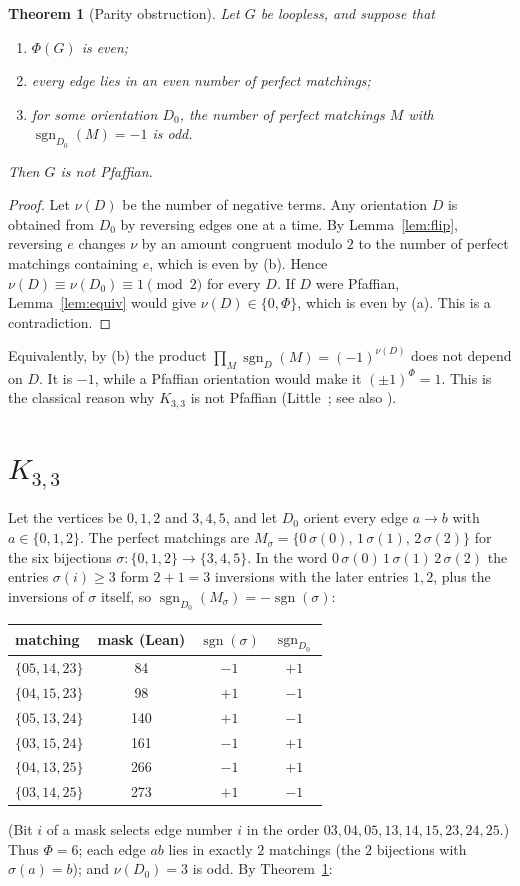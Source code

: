 \documentclass[11pt]{article}
\newtheorem{theorem}{Theorem}
\theoremstyle{definition}
\theoremstyle{remark}
\begin{document}
\begin{theorem}[Parity obstruction]\label{thm:obstruction}
Let $G$ be loopless, and suppose that
\begin{enumerate}
\item[(a)] $\Phi(G)$ is even;
\item[(b)] every edge lies in an even number of perfect matchings;
\item[(c)] for some orientation $D_0$, the number of perfect matchings $M$ with
$\operatorname{sgn}_{D_0}(M)=-1$ is odd.
\end{enumerate}
Then $G$ is not Pfaffian.
\end{theorem}
\begin{proof}
Let $\nu(D)$ be the number of negative terms. Any orientation $D$ is obtained from
$D_0$ by reversing edges one at a time. By Lemma~\ref{lem:flip}, reversing $e$
changes $\nu$ by an amount congruent modulo $2$ to the number of perfect matchings
containing $e$, which is even by (b). Hence $\nu(D)\equiv\nu(D_0)\equiv1\pmod2$ for
every $D$. If $D$ were Pfaffian, Lemma~\ref{lem:equiv} would give $\nu(D)\in\{0,\Phi\}$,
which is even by (a). This is a contradiction.
\end{proof}
Equivalently, by (b) the product $\prod_M\operatorname{sgn}_D(M)=(-1)^{\nu(D)}$ does not
depend on $D$. It is $-1$, while a Pfaffian orientation would make it
$(\pm1)^{\Phi}=1$. This is the classical reason why $K_{3,3}$ is not Pfaffian
(Little~\cite{little}; see also \cite{lp,rst}).

\section[K\_\{3,3\}]{\texorpdfstring{$K_{3,3}$}{K33}}
Let the vertices be $0,1,2$ and $3,4,5$, and let $D_0$ orient every edge $a\to b$ with
$a\in\{0,1,2\}$. The perfect matchings are $M_\sigma=\{0\,\sigma(0),\,1\,\sigma(1),\,2\,\sigma(2)\}$
for the six bijections $\sigma:\{0,1,2\}\to\{3,4,5\}$. In the word
$0\,\sigma(0)\,1\,\sigma(1)\,2\,\sigma(2)$ the entries $\sigma(i)\ge3$ form $2+1=3$
inversions with the later entries $1,2$, plus the inversions of $\sigma$ itself, so
$\operatorname{sgn}_{D_0}(M_\sigma)=-\operatorname{sgn}(\sigma)$:
\begin{center}
\begin{tabular}{lccc}
\toprule
matching & mask (Lean) & $\operatorname{sgn}(\sigma)$ & $\operatorname{sgn}_{D_0}$\\
\midrule
$\{05,14,23\}$ & 84 & $-1$ & $+1$\\
$\{04,15,23\}$ & 98 & $+1$ & $-1$\\
$\{05,13,24\}$ & 140 & $+1$ & $-1$\\
$\{03,15,24\}$ & 161 & $-1$ & $+1$\\
$\{04,13,25\}$ & 266 & $-1$ & $+1$\\
$\{03,14,25\}$ & 273 & $+1$ & $-1$\\
\bottomrule
\end{tabular}
\end{center}
(Bit $i$ of a mask selects edge number $i$ in the order $03,04,05,13,14,15,23,24,25$.)
Thus $\Phi=6$; each edge $ab$ lies in exactly $2$ matchings (the $2$ bijections with
$\sigma(a)=b$); and $\nu(D_0)=3$ is odd. By Theorem~\ref{thm:obstruction}:
\end{document}
